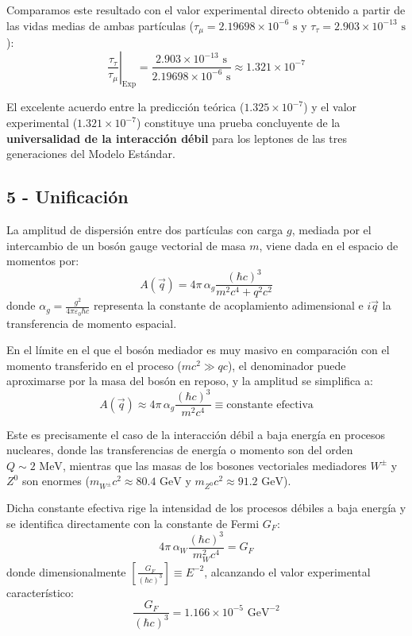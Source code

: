 Comparamos este resultado con el valor experimental directo obtenido a partir de las vidas medias de ambas partículas ($\tau_\mu = 2.19698 \times 10^{-6}\text{ s}$ y $\tau_\tau = 2.903 \times 10^{-13}\text{ s}$):
\begin{equation}
    \left. \frac{\tau_\tau}{\tau_\mu} \right|_{\text{Exp}} = \frac{2.903 \times 10^{-13}\text{ s}}{2.19698 \times 10^{-6}\text{ s}} \approx 1.321 \times 10^{-7}
\end{equation}

El excelente acuerdo entre la predicción teórica ($1.325 \times 10^{-7}$) y el valor experimental ($1.321 \times 10^{-7}$) constituye una prueba concluyente de la \textbf{universalidad de la interacción débil} para los leptones de las tres generaciones del Modelo Estándar.

\newpage
\subsection{5 - Unificación}

La amplitud de dispersión entre dos partículas con carga $g$, mediada por el intercambio de un bosón gauge vectorial de masa $m$, viene dada en el espacio de momentos por:
\begin{equation}
    A(\vec{q}) = 4\pi \, \alpha_g \frac{(\hbar c)^3}{m^2 c^4 + q^2 c^2}
\end{equation}
donde $\alpha_g = \frac{g^2}{4\pi \varepsilon_0 \hbar c}$ representa la constante de acoplamiento adimensional e $i\vec{q}$ la transferencia de momento espacial.

En el límite en el que el bosón mediador es muy masivo en comparación con el momento transferido en el proceso ($m c^2 \gg q c$), el denominador puede aproximarse por la masa del bosón en reposo, y la amplitud se simplifica a:
\begin{equation}
    A(\vec{q}) \approx 4\pi \, \alpha_g \frac{(\hbar c)^3}{m^2 c^4} \equiv \text{constante efectiva}
\end{equation}

Este es precisamente el caso de la interacción débil a baja energía en procesos nucleares, donde las transferencias de energía o momento son del orden $Q \sim 2\text{ MeV}$, mientras que las masas de los bosones vectoriales mediadores $W^\pm$ y $Z^0$ son enormes ($m_{W^\pm} c^2 \approx 80.4\text{ GeV}$ y $m_{Z^0} c^2 \approx 91.2\text{ GeV}$).

Dicha constante efectiva rige la intensidad de los procesos débiles a baja energía y se identifica directamente con la constante de Fermi $G_F$:
\begin{equation}
    4\pi \, \alpha_W \frac{(\hbar c)^3}{m_W^2 c^4} = G_F
\end{equation}
donde dimensionalmente $\left[ \frac{G_F}{(\hbar c)^3} \right] \equiv E^{-2}$, alcanzando el valor experimental característico:
\begin{equation}
    \frac{G_F}{(\hbar c)^3} = 1.166 \times 10^{-5}\text{ GeV}^{-2}
\end{equation}

